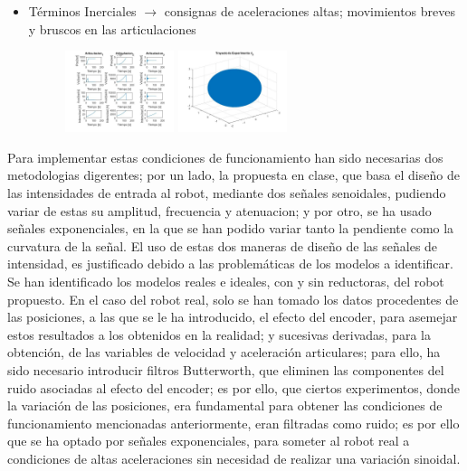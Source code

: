 \begin{itemize}
		\item Términos Inerciales $ \rightarrow $ consignas de aceleraciones altas; movimientos breves y bruscos en las articulaciones
		\begin{figure}[h]
			\centering
			\includegraphics[width=0.3\textwidth]{graftheta3}
			\includegraphics[width=0.3\textwidth]{Traytheta3}
		\end{figure}
		

	\end{itemize}

	Para implementar estas condiciones de funcionamiento han sido necesarias dos metodologias digerentes;
	por un lado, la propuesta en clase, que basa el diseño de las intensidades de entrada al robot,
	mediante dos señales senoidales, pudiendo variar de estas su amplitud, frecuencia y atenuacion; 
	y por otro, se ha usado señales exponenciales, en la que se han podido variar tanto la pendiente como la curvatura de la señal.	El uso de estas dos maneras de diseño de las señales de intensidad, es justificado debido a las problemáticas
	de los modelos a identificar.\\
	
	Se han identificado los modelos reales e ideales, con y sin reductoras, del robot propuesto. 
	En el caso del robot real, solo se han tomado los datos procedentes de las posiciones, a las que se le ha introducido,
	el efecto del encoder, para asemejar estos resultados a los obtenidos en la realidad; y sucesivas derivadas, para la obtención,
	de las variables de velocidad y aceleración articulares; para ello, ha sido necesario introducir filtros Butterworth, que eliminen
	las componentes del ruido asociadas al efecto del encoder; es por ello, que ciertos experimentos, donde la variación
	de las posiciones, era fundamental para obtener las condiciones de funcionamiento mencionadas anteriormente, eran filtradas
	como ruido; es por ello que se ha optado por señales exponenciales, para someter al robot real a condiciones de altas aceleraciones sin 
	necesidad de realizar una variación sinoidal.



